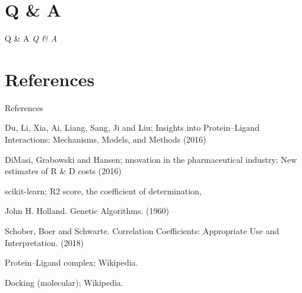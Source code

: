 \documentclass{beamer}
\begin{document}
\section{Q \& A}

\begin{frame}[t]{Q \& A}
  \centering \Huge
  \emph{Q \& A}
\end{frame}

\section{References}

\begin{frame}[t]{References}

\begin{thebibliography}{1}

\alert{Du,  Li,  Xia,  Ai,  Liang,  Sang,  Ji and Liu; Insights into Protein–Ligand Interactions: Mechanisms, Models, and Methods (2016)}

\alert{DiMasi,  Grabowski and Hansen; nnovation in the pharmaceutical industry: New estimates of R \& D costs (2016)}

\alert{scikit-learn; R2 score, the coefficient of determination},

\alert{John H. Holland.  Genetic Algorithms. (1960)}

\alert{Schober, Boer and Schwarte. Correlation Coefficients: Appropriate Use and Interpretation. (2018)}

\alert{Protein–Ligand complex; Wikipedia.}

\alert{Docking (molecular); Wikipedia.}

\end{thebibliography}

\end{frame}
\end{document}
